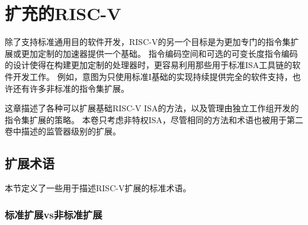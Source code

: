 \chapter{扩充的RISC-V}
\label{extensions}

除了支持标准通用目的软件开发，RISC-V的另一个目标是为更加专门的指令集扩展或更加定制的加速器提供一个基础。
指令编码空间和可选的可变长度指令编码的设计使得在构建更加定制的处理器时，更容易利用那些用于标准ISA工具链的软件开发工作。
例如，意图为只使用标准I基础的实现持续提供完全的软件支持，也许还有许多非标准的指令集扩展。

这章描述了各种可以扩展基础RISC-V ISA的方法，以及管理由独立工作组开发的指令集扩展的策略。
本卷只考虑非特权ISA，尽管相同的方法和术语也被用于第二卷中描述的监管器级别的扩展。

\section{扩展术语}

本节定义了一些用于描述RISC-V扩展的标准术语。
\vspace{-0.2in}
\subsection*{标准扩展vs非标准扩展}

